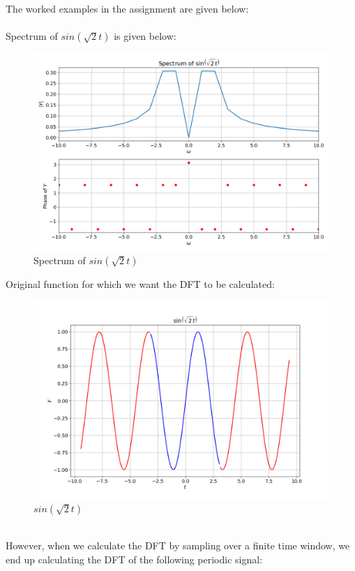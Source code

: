 \documentclass{article}
\begin{document}
The worked examples in the assignment are given below: \\ \\
\noindent
Spectrum of $sin(\sqrt{2}t)$ is given below: \newline
\begin{figure}[!tbh]
\centering
\includegraphics[scale=0.4]{plots/sin(sqrt(2).png}
\caption{Spectrum of $sin(\sqrt{2}t)$}
\label{fig:1}
\end{figure}
\newpage
Original function for which we want the DFT to be calculated:
\begin{figure}[!tbh]
\centering
\includegraphics[scale=0.4]{plots/sin(sqrt(2)_plot.png}
\caption{$sin(\sqrt{2}t)$}
\label{fig:2}
\end{figure}
\noindent
\\
However, when we calculate the DFT by sampling over a finite time
window, we end up calculating the DFT of the following periodic signal:
\end{document}
